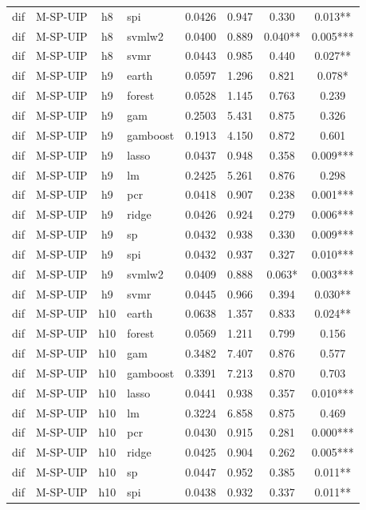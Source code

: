 \begin{ThreePartTable}
\begin{longtable}[t]{llclcccc}
dif & M-SP-UIP & h8 & spi & 0.0426 & 0.947 & 0.330 & 0.013**\\
dif & M-SP-UIP & h8 & svmlw2 & 0.0400 & 0.889 & 0.040** & 0.005***\\
dif & M-SP-UIP & h8 & svmr & 0.0443 & 0.985 & 0.440 & 0.027**\\
\addlinespace
dif & M-SP-UIP & h9 & earth & 0.0597 & 1.296 & 0.821 & 0.078*\\
dif & M-SP-UIP & h9 & forest & 0.0528 & 1.145 & 0.763 & 0.239\\
dif & M-SP-UIP & h9 & gam & 0.2503 & 5.431 & 0.875 & 0.326\\
dif & M-SP-UIP & h9 & gamboost & 0.1913 & 4.150 & 0.872 & 0.601\\
dif & M-SP-UIP & h9 & lasso & 0.0437 & 0.948 & 0.358 & 0.009***\\
dif & M-SP-UIP & h9 & lm & 0.2425 & 5.261 & 0.876 & 0.298\\
dif & M-SP-UIP & h9 & pcr & 0.0418 & 0.907 & 0.238 & 0.001***\\
dif & M-SP-UIP & h9 & ridge & 0.0426 & 0.924 & 0.279 & 0.006***\\
dif & M-SP-UIP & h9 & sp & 0.0432 & 0.938 & 0.330 & 0.009***\\
dif & M-SP-UIP & h9 & spi & 0.0432 & 0.937 & 0.327 & 0.010***\\
dif & M-SP-UIP & h9 & svmlw2 & 0.0409 & 0.888 & 0.063* & 0.003***\\
dif & M-SP-UIP & h9 & svmr & 0.0445 & 0.966 & 0.394 & 0.030**\\
\addlinespace
dif & M-SP-UIP & h10 & earth & 0.0638 & 1.357 & 0.833 & 0.024**\\
dif & M-SP-UIP & h10 & forest & 0.0569 & 1.211 & 0.799 & 0.156\\
dif & M-SP-UIP & h10 & gam & 0.3482 & 7.407 & 0.876 & 0.577\\
dif & M-SP-UIP & h10 & gamboost & 0.3391 & 7.213 & 0.870 & 0.703\\
dif & M-SP-UIP & h10 & lasso & 0.0441 & 0.938 & 0.357 & 0.010***\\
dif & M-SP-UIP & h10 & lm & 0.3224 & 6.858 & 0.875 & 0.469\\
dif & M-SP-UIP & h10 & pcr & 0.0430 & 0.915 & 0.281 & 0.000***\\
dif & M-SP-UIP & h10 & ridge & 0.0425 & 0.904 & 0.262 & 0.005***\\
dif & M-SP-UIP & h10 & sp & 0.0447 & 0.952 & 0.385 & 0.011**\\
dif & M-SP-UIP & h10 & spi & 0.0438 & 0.932 & 0.337 & 0.011**\\

\end{longtable}
\end{ThreePartTable}

